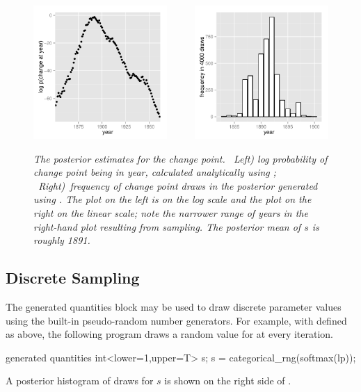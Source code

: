 \begin{figure}
\begin{center}
\includegraphics[height=2in]{img/change-point-posterior.pdf}
\ \ \ \ \
\includegraphics[height=2in]{img/s-discrete-posterior.pdf}
\end{center}
\vspace*{-12pt}
\caption{\small\it The posterior estimates for the change point.  \
  {\rm Left)} log probability of change point being in year,
  calculated analytically using ; \ {\rm Right)}\ frequency
  of change point draws in the posterior generated using
  \code{lp}. The plot on the left is on the log scale and the plot on
  the right on the linear scale; note the narrower range of years in
  the right-hand plot resulting from sampling. The posterior mean of
  $s$ is roughly 1891.}%
\label{change-point-posterior.figure}
\end{figure}
%



\subsection{Discrete Sampling}

The generated quantities block may be used to draw discrete parameter
values using the built-in pseudo-random number generators.  For
example, with \code{lp} defined as above, the following program
draws a random value for \code{s} at every iteration.
%
\begin{stancode}
generated quantities {
  int<lower=1,upper=T> s;
  s = categorical_rng(softmax(lp));
}
\end{stancode}
%
A posterior histogram of draws for $s$ is shown on the right side of
.

